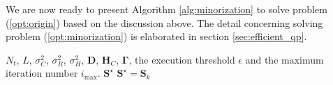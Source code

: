 \documentclass[lettersize,journal]{IEEEtran}
\begin{document}
We are now ready to present Algorithm \ref{alg:minorization} to solve problem (\ref{opt:origin})  based on the discussion above. The detail concerning solving problem (\ref{opt:minorization}) is elaborated in section \ref{sec:efficient_qp}.
\begin{algorithm}
\caption{Minorization Method for Solving (\ref{opt:origin})}
\label{alg:minorization}
\begin{algorithmic}[1]
    \REQUIRE $N_t$, $L$, $\sigma_C^2$, $\sigma_R^2$, $\sigma_H^2$, $\mathbf{D}$, $\mathbf{H}_C$, $\mathbf{\Gamma}$, the execution threshold $\epsilon$ and the maximum iteration number $i_{\max}$.
    \ENSURE $\mathbf{S}^{\star}$
    \STATE $\mathbf{S}^{\star}=\mathbf{S}_k$
\end{algorithmic}
\end{algorithm}
\end{document}
